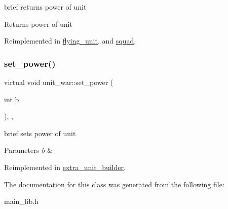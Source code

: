 brief returns power of unit \begin{DoxyReturn}{Returns}
power of unit 
\end{DoxyReturn}


Reimplemented in \mbox{\hyperlink{classflying__unit_a95333465a28d47bc5d50427fd3e2cef4}{flying\+\_\+unit}}, and \mbox{\hyperlink{classsquad_a7e719229279a2dd4948f1949d2fe2ccc}{squad}}.

\mbox{\label{classunit__war_a8ea09eb3e352d5a3b2d7611ac78124a2}} 
\subsubsection{\texorpdfstring{set\+\_\+power()}{set\_power()}}
{\footnotesize\ttfamily virtual void unit\+\_\+war\+::set\+\_\+power (\begin{DoxyParamCaption}\item[{int}]{b }\end{DoxyParamCaption})\hspace{0.3cm}{\ttfamily [inline]}, {\ttfamily [protected]}, {\ttfamily [virtual]}}

brief sets power of unit 
\begin{DoxyParams}{Parameters}
{\em b} & \\
\hline
\end{DoxyParams}


Reimplemented in \mbox{\hyperlink{classextra__unit__builder_a98602fd267039102bd6b431bdf5b658d}{extra\+\_\+unit\+\_\+builder}}.



The documentation for this class was generated from the following file\+:\begin{DoxyCompactItemize}
\item 
main\+\_\+lib.\+h\end{DoxyCompactItemize}
